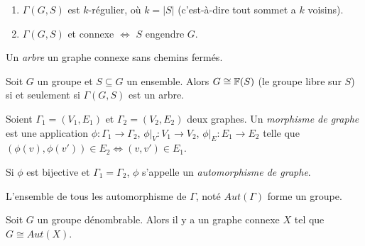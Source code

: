   \begin{propri}
    \begin{enumerate}
    \item $\Gamma(G,S)$ est $k$-régulier, où $k = |S|$ (c'est-à-dire tout sommet a $k$ voisins).
    \item $\Gamma(G,S)$ et connexe $\iff$ $S$ engendre $G$.
    \end{enumerate}
  \end{propri}

  \begin{defi} 
    Un \emph{arbre} un graphe connexe sans chemins fermés.
  \end{defi}

  \begin{prop}
    Soit $G$ un groupe et $S \subseteq G$ un ensemble. Alors $G \cong \mathbb{F}(S)$ (le groupe libre sur $S$) si et
    seulement si $\Gamma(G, S)$ est un arbre.
  \end{prop}


  \begin{defi}
    Soient $\Gamma_1 = (V_1, E_1)$ et $\Gamma_2 = (V_2, E_2)$ deux graphes. Un \emph{morphisme de graphe}
     est une application $\phi: \Gamma_1 \to \Gamma_2$, $\phi \big|_V : V_1 \to
    V_2$, $\phi \big|_E : E_1 \to E_2$ telle que $(\phi(v), \phi(v')) \in E_2 \iff (v, v') \in E_1$.

    Si $\phi$ est bijective et $\Gamma_1 = \Gamma_2$, $\phi$ s'appelle un \emph{automorphisme de graphe}.

    L'ensemble de tous les automorphisme de $\Gamma$, noté $Aut(\Gamma)$ forme un groupe.
  \end{defi}


  \begin{theo}
    Soit $G$ un groupe dénombrable. Alors il y a un graphe connexe $X$ tel que $G \cong Aut(X)$.
  \end{theo}

